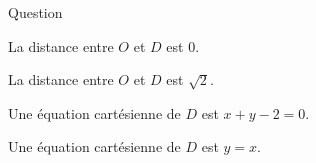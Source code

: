 \begin{multi}[multiple,feedback=
{\(D\) est la droite passant par \(H\) et \(\overrightarrow{OH}=(1,1)\) en est un vecteur normal.
}]{Question}
    \item La distance entre \(O\) et \(D\) est \(0\).
    \item* La distance entre \(O\) et \(D\) est \(\sqrt{2}\).
    \item* Une équation cartésienne de \(D\) est \(x+y-2=0\).
    \item Une équation cartésienne de \(D\) est \(y=x\).
\end{multi}
